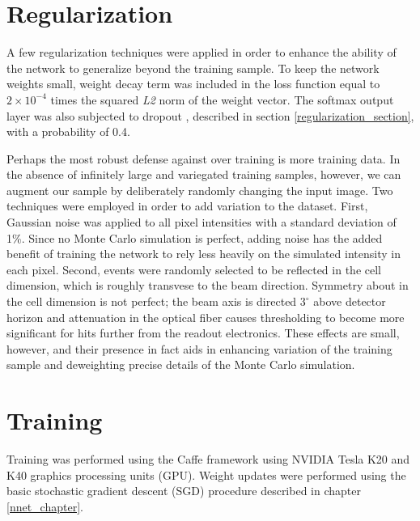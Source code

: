 \clearpage

\section{Regularization}

A few regularization techniques were applied in order to enhance the ability
of the network to generalize beyond the training sample.
To keep the network weights small, weight decay term was included in the loss
function equal to $2\times 10^{-4}$ times the squared \textit{L2} norm of the
weight vector.
The softmax output layer was also subjected to dropout
\cite{hinton2014dropout}, described in section \ref{regularization_section},
with a probability of 0.4.

Perhaps the most robust defense against over training is more training
data.
In the absence of infinitely large and variegated training samples, however,
we can augment our sample by deliberately randomly changing the input image.
Two techniques were employed in order to add variation to the dataset.
First, Gaussian noise was applied to all pixel intensities with
a standard deviation of 1\%.
Since no Monte Carlo simulation is perfect, adding noise has the added benefit
of training the network to rely less heavily on the simulated intensity
in each pixel.
Second, events were randomly selected to be reflected in the cell dimension,
which is roughly transvese to the beam direction.
Symmetry about in the cell dimension is not perfect; the beam axis is directed
$3^{\circ}$ above detector horizon and attenuation in the optical fiber
causes thresholding to become more significant for hits further from
the readout electronics.
These effects are small, however, and their presence in fact aids in
enhancing variation of the training sample and deweighting precise details
of the Monte Carlo simulation.


\section{Training}

Training was performed using the Caffe framework \cite{jia2014caffe}
using NVIDIA Tesla K20 and K40 graphics processing units (GPU).
Weight updates were
performed using the basic stochastic gradient descent (SGD)
\cite{reed1999neural} procedure described in chapter \ref{nnet_chapter}.

